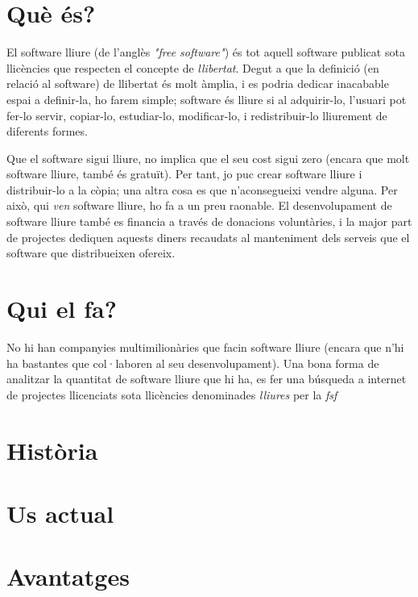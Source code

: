 \section{Què és?}

El software lliure (de l'anglès \emph{"free software"}) és tot aquell software publicat
sota llicències que respecten el concepte de \emph{llibertat}. Degut a que la definició
(en relació al software) de llibertat és molt àmplia, i es podria dedicar inacabable espai
a definir-la, ho farem simple; software és lliure si al adquirir-lo, l'usuari pot fer-lo servir,
copiar-lo, estudiar-lo, modificar-lo, i redistribuir-lo lliurement de diferents formes. \cite{wikifree}

Que el software sigui lliure, no implica que el seu cost sigui zero (encara que molt
software lliure, també és gratuït). Per tant, jo puc crear software lliure i distribuir-lo a
 la còpia; una altra cosa es que n'aconsegueixi vendre alguna.
Per això, qui \emph{ven} software lliure, ho fa a un preu raonable. El desenvolupament de software
lliure també es financia a través de donacions voluntàries, i la major part de projectes dediquen
aquests diners recaudats al manteniment dels serveis que el software que distribueixen ofereix.

\section{Qui el fa?}

No hi han companyies multimilionàries que facin software lliure (encara que n'hi ha bastantes que
col·laboren al seu desenvolupament). Una bona forma de analitzar la quantitat de software lliure
que hi ha, es fer una búsqueda a internet de projectes llicenciats sota llicències denominades
\emph{lliures} per la \emph{\ac{fsf}} \cite{licenses}

\section{Història}

\section{Us actual}

\section{Avantatges}
